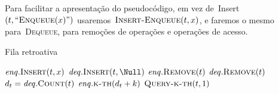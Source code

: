 \documentclass[main.tex]{subfiles}
\begin{document}
Para facilitar a apresentação do pseudocódigo, em vez de~Insert$(t, ``\Call{Enqueue}{x}")$ usaremos~$\Call{Insert-Enqueue}{t, x}$, e faremos o mesmo para~\textsc{Dequeue}, para remoções de operações e operações de acesso.

\begin{algorithm}
\caption{Fila retroativa} \label{lst:filaretro}
\begin{algorithmic}[1]
		\State $\enqs.\Call{Insert}{t, x}$
	\EndFunction
		\State $\deqs.\Call{Insert}{t, \Null}$
	\EndFunction
		\State $\enqs.\Call{Remove}{t}$
	\EndFunction
		\State $\deqs.\Call{Remove}{t}$
	\EndFunction
		\State $d_t = \deqs.\Call{Count}{t}$ 
		\State \Return $\enqs.\Call{k-th}{d_t + k}$
	\EndFunction
		\State \Return $\Call{Query-k-th}{t, 1}$
	\EndFunction
\end{algorithmic}
\end{algorithm}
\end{document}
